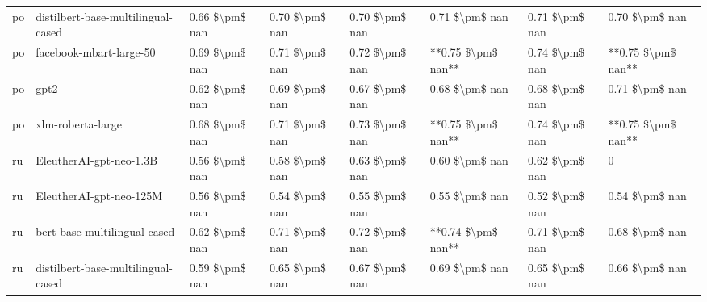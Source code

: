 \begin{tabular}{llllllll}
      po & distilbert-base-multilingual-cased & 0.66 \$\textbackslash pm\$ nan &            0.70 \$\textbackslash pm\$ nan &        0.70 \$\textbackslash pm\$ nan &         0.71 \$\textbackslash pm\$ nan &                          0.71 \$\textbackslash pm\$ nan &     0.70 \$\textbackslash pm\$ nan \\
      po &            facebook-mbart-large-50 & 0.69 \$\textbackslash pm\$ nan &            0.71 \$\textbackslash pm\$ nan &        0.72 \$\textbackslash pm\$ nan &     **0.75 \$\textbackslash pm\$ nan** &                          0.74 \$\textbackslash pm\$ nan & **0.75 \$\textbackslash pm\$ nan** \\
      po &                               gpt2 & 0.62 \$\textbackslash pm\$ nan &            0.69 \$\textbackslash pm\$ nan &        0.67 \$\textbackslash pm\$ nan &         0.68 \$\textbackslash pm\$ nan &                          0.68 \$\textbackslash pm\$ nan &     0.71 \$\textbackslash pm\$ nan \\
      po &                  xlm-roberta-large & 0.68 \$\textbackslash pm\$ nan &            0.71 \$\textbackslash pm\$ nan &        0.73 \$\textbackslash pm\$ nan &     **0.75 \$\textbackslash pm\$ nan** &                          0.74 \$\textbackslash pm\$ nan & **0.75 \$\textbackslash pm\$ nan** \\
      ru &            EleutherAI-gpt-neo-1.3B & 0.56 \$\textbackslash pm\$ nan &            0.58 \$\textbackslash pm\$ nan &        0.63 \$\textbackslash pm\$ nan &         0.60 \$\textbackslash pm\$ nan &                          0.62 \$\textbackslash pm\$ nan &                  0 \\
      ru &            EleutherAI-gpt-neo-125M & 0.56 \$\textbackslash pm\$ nan &            0.54 \$\textbackslash pm\$ nan &        0.55 \$\textbackslash pm\$ nan &         0.55 \$\textbackslash pm\$ nan &                          0.52 \$\textbackslash pm\$ nan &     0.54 \$\textbackslash pm\$ nan \\
      ru &       bert-base-multilingual-cased & 0.62 \$\textbackslash pm\$ nan &            0.71 \$\textbackslash pm\$ nan &        0.72 \$\textbackslash pm\$ nan &     **0.74 \$\textbackslash pm\$ nan** &                          0.71 \$\textbackslash pm\$ nan &     0.68 \$\textbackslash pm\$ nan \\
      ru & distilbert-base-multilingual-cased & 0.59 \$\textbackslash pm\$ nan &            0.65 \$\textbackslash pm\$ nan &        0.67 \$\textbackslash pm\$ nan &         0.69 \$\textbackslash pm\$ nan &                          0.65 \$\textbackslash pm\$ nan &     0.66 \$\textbackslash pm\$ nan \\

\end{tabular}
